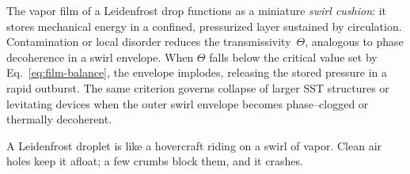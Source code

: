 \documentclass[10pt,reprint,aps,onecolumn,nofootinbib]{revtex4-2}
\begin{document}
    The vapor film of a Leidenfrost drop functions as a miniature
    \emph{swirl cushion}: it stores mechanical energy in a confined,
    pressurized layer sustained by circulation.
    Contamination or local disorder reduces the transmissivity~$\Theta$,
    analogous to phase decoherence in a swirl envelope.
    When $\Theta$ falls below the critical value set by
    Eq.~\eqref{eq:film-balance}, the envelope implodes,
    releasing the stored pressure in a rapid outburst.
    The same criterion governs collapse of larger SST structures or
    levitating devices when the outer swirl envelope becomes phase--clogged
    or thermally decoherent.

    \begin{tcolorbox}[colframe=black, title={Physical Analogy}]
    A Leidenfrost droplet is like a hovercraft riding on a swirl of vapor.
    Clean air holes keep it afloat; a few crumbs block them, and it crashes.
    \end{tcolorbox}

\end{document}
